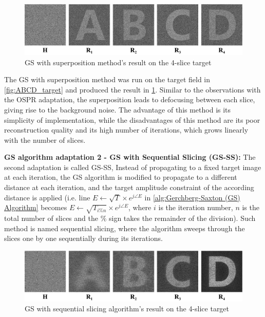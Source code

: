 \begin{figure}[H]
  \centering
  \includegraphics[width=1.0\textwidth]{ABCD/GS_noSS_ABCD.pdf}
  \caption{GS with superposition method's result on the 4-slice target}
  \label{fig:GS_noSS_ABCD}
\end{figure}

The GS with superposition method was run on the target field in \cref{fig:ABCD_target} and produced the result in \cref{fig:GS_noSS_ABCD}. Similar to the observations with the OSPR adaptation, the superposition leads to defocusing between each slice, giving rise to the background noise. The advantage of this method is its simplicity of implementation, while the disadvantages of this method are its poor reconstruction quality and its high number of iterations, which grows linearly with the number of slices.


\textbf{GS algorithm adaptation 2 - GS with Sequential Slicing (GS-SS): }
The second adaptation is called GS-SS, Instead of propagating to a fixed target image at each iteration, the GS algorithm is modified to propagate to a different distance at each iteration, and the target amplitude constraint of the according distance is applied (i.e. line $E \gets \sqrt{T} \times e^{j\angle E}$ in \cref{alg:Gerchberg-Saxton (GS) Algorithm} becomes $E \gets \sqrt{T_{i\%n}} \times e^{j\angle E}$, where $i$ is the iteration number, $n$ is the total number of slices and the $\%$ sign takes the remainder of the division). Such method is named sequential slicing, where the algorithm sweeps through the slices one by one sequentially during its iterations.

\begin{figure}[H]
  \centering
  \includegraphics[width=1.0\textwidth]{ABCD/GS_SS_ABCD.pdf}
  \caption{GS with sequential slicing algorithm's result on the 4-slice target}
  \label{fig:GS_SS_ABCD}
\end{figure}

